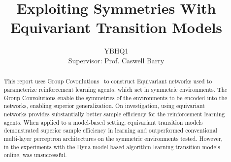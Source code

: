 
\title{Exploiting Symmetries With Equivariant Transition Models}
\author{YBHQ1\\Supervisor: Prof. Caswell Barry}

\maketitle

\begin{abstract} %
	This report uses Group Covonlutions~\cite{cohen2016group} to construct Equivariant networks used to parameterize reinforcement learning agents, which act in symmetric environments. The Group Convolutions enable the symmetries of the environments to be encoded into the networks, enabling superior generalization. On investigation, using equivariant networks provides substantially better sample efficiency for the reinforcement learning agents. When applied to a model-based setting, equivariant transition models demonstrated superior sample efficiency in learning and outperformed conventional multi-layer perceptron architectures on the symmetric environments tested. However, in the experiments with the Dyna model-based algorithm learning transition models online, was unsuccessful.
\end{abstract}


\setcounter{tocdepth}{2}

\tableofcontents
\listoffigures
\listoftables

